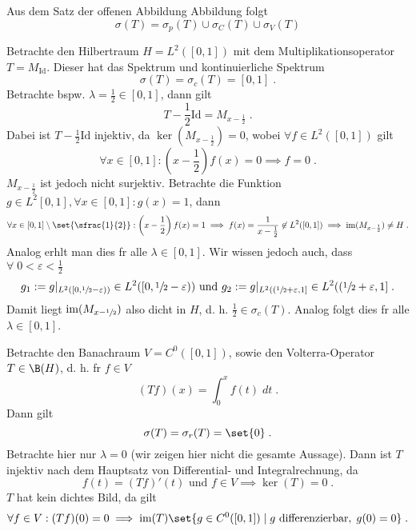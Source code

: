 \begin{rem} Aus dem Satz der offenen Abbildung Abbildung folgt \[\sigma(T) = \sigma_p(T) \cup \sigma_C(T) \cup \sigma_V(T)\]
\end{rem}

\begin{ex}
	Betrachte den Hilbertraum \(H = L^2([0,1])\) mit dem Multiplikationsoperator \(T = M_\text{Id}\). Dieser hat das Spektrum und kontinuierliche Spektrum
	\[\sigma(T) =\sigma_c(T)= [0,1]\;.\] 
	Betrachte bspw. \(\lambda = \frac{1}{2} \in [0,1]\), dann gilt
	\[T - \frac{1}{2}\text{Id} = M_{x-\frac 12}\;.\]
	Dabei ist \(T-\frac{1}{2}\text{Id}\) injektiv, da \(\ker(M_{x-\frac 12}) = 0\), wobei \(\forall f\in L^2([0,1])\) gilt
	\[\forall x \in [0,1]: \left(x-\frac12\right)f(x) = 0 \implies f = 0\;.\]
	\(M_{x-\frac 12}\) ist jedoch nicht surjektiv. Betrachte die Funktion \(g\in L^2[0,1], \forall x \in [0,1]: g(x) = 1\), dann
	\[\forall x \in [0,1]\setminus\set{\sfrac{1}{2}}: \left(x-\frac 12\right) f(x) = 1 \implies f(x) = \frac{1}{x - \frac 12} \not\in L^2([0,1]) \implies \text{im}(M_{x-\frac12}) \neq H\;.\]
	Analog erh\as lt man dies f\us r alle \(\lambda \in [0,1]\). Wir wissen jedoch auch, dass \(\forall \;0< \varepsilon < \frac12\)
	\[g_1 := g\vert_{L^2([0,\sfrac 12 - \varepsilon))} \in L^2([0, \sfrac12 - \varepsilon)) \text{ und } g_2 := g\vert_{L^2((\sfrac 12 + \varepsilon,1]} \in L^2((\sfrac 12 + \varepsilon,1]\;.\]
	Damit liegt \(\text{im}(M_{x-\sfrac 12})\) also dicht in $H$, d. h. \(\frac 12 \in \sigma_c(T)\). Analog folgt dies f\us r alle \(\lambda  \in [0,1]\).
\end{ex}

\begin{ex}
	Betrachte den Banachraum \(V = C^0([0,1])\), sowie den Volterra-Operator \(T\in \B(H)\), d. h. f\us r \(f \in V\)
	\[(Tf)(x) = \int_0^x f(t) \;dt\;.\]
	Dann gilt 
	\[\sigma(T) = \sigma_r(T) = \set{0}\;.\]
	Betrachte hier nur \(\lambda = 0\) (wir zeigen hier nicht die gesamte Aussage). Dann ist $T$ injektiv nach dem Hauptsatz von Differential- und Integralrechnung, da 
	\[f(t) = (Tf)'(t) \text{ und } f \in V \implies \ker(T) = {0}\;.\]  
	$T$ hat kein dichtes Bild, da gilt
	\[\forall f \in V: (Tf)(0) = 0 \implies \text{im}(T) \set{g \in C^0([0,1])\;\vert\; g \text{ differenzierbar}, \;g(0) = 0} \;.\]
\end{ex}

